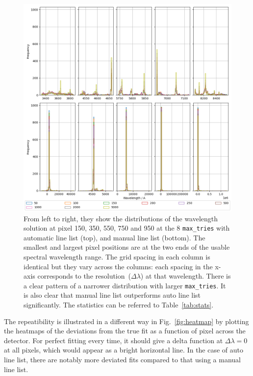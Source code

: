 \documentclass{aa}
\begin{document}
\begin{figure}[h]
    \centering
    \includegraphics[width=\textwidth]{plots/figure_5_wavelengths.png}
    \caption{From left to right, they show the distributions of the wavelength solution at pixel 150, 350, 550, 750 and 950 at the 8 \texttt{max\_tries} with automatic line list (top), and manual line list (bottom). The smallest and largest pixel positions are at the two ends of the usable spectral wavelength range. The grid spacing in each column is identical but they vary across the columns: each spacing in the x-axis corresponds to the resolution~($\Delta\lambda$) at that wavelength. There is a clear pattern of a narrower distribution with larger \texttt{max\_tries}. It is also clear that manual line list outperforms auto line list significantly. The statistics can be referred to Table~\ref{tab:stats}.}
    \label{fig:wavelengths}
\end{figure}

The repeatibility is illustrated in a different way in Fig.~\ref{fig:heatmap} by
plotting the heatmaps of the deviations from the true fit as a function of pixel
across the detector. For perfect fitting every time, it should give a delta function
at $\Delta \lambda = 0$ at all pixels, which would appear as a bright horizontal line.
In the case of auto line list, there are notably more deviated fits compared to
that using a manual line list. 
\end{document}
